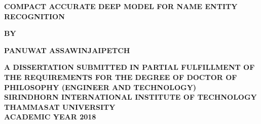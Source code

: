 
    \begin{center}
        
        \large
        \textbf{COMPACT ACCURATE DEEP MODEL FOR NAME ENTITY RECOGNITION}
        
        \vspace{2cm}
        
        \textbf{BY}
        
        \vspace{1.5cm}
        
        \textbf{PANUWAT ASSAWINJAIPETCH}
        
        \vfill
        
        \textbf{\normalsize{A DISSERTATION SUBMITTED IN PARTIAL FULFILLMENT OF \\
        THE REQUIREMENTS FOR THE DEGREE OF DOCTOR OF PHILOSOPHY (ENGINEER AND TECHNOLOGY) \\
        SIRINDHORN INTERNATIONAL INSTITUTE OF TECHNOLOGY \\
        THAMMASAT UNIVERSITY \\ 
        ACADEMIC YEAR 2018}}

        
    \end{center}